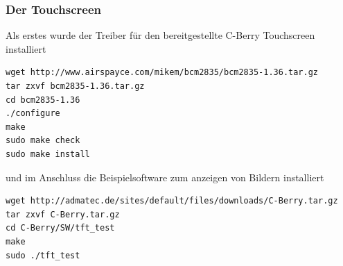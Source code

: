 \documentclass[11pt,a4paper]{article} %
\begin{document}
\subsubsection{Der Touchscreen}
Als erstes wurde der Treiber für den bereitgestellte C-Berry Touchscreen installiert
\begin{frame}

\begin{lstlisting}
wget http://www.airspayce.com/mikem/bcm2835/bcm2835-1.36.tar.gz
tar zxvf bcm2835-1.36.tar.gz
cd bcm2835-1.36
./configure
make
sudo make check
sudo make install
\end{lstlisting}

\end{frame}
und im Anschluss die Beispielsoftware zum anzeigen von Bildern installiert
\begin{frame}

\begin{lstlisting}
wget http://admatec.de/sites/default/files/downloads/C-Berry.tar.gz
tar zxvf C-Berry.tar.gz
cd C-Berry/SW/tft_test
make
sudo ./tft_test
\end{lstlisting}

\end{frame}
\end{document}
